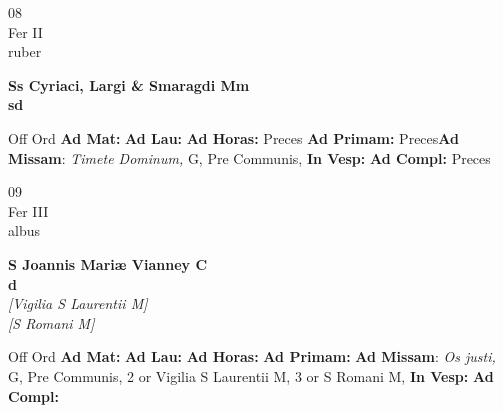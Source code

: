 \documentclass[10pt, openany]{book}
\begin{document}
    \begin{center}
        \begin{minipage}{3.5in}
            \vspace{2em}
            \begin{minipage}{0.5in}
                {\Huge 08} \\
                {\normalsize Fer II} \\
                {\normalsize ruber}
            \end{minipage}
            \begin{minipage}{3.0in}
                \textbf{ \large Ss Cyriaci, Largi \& Smaragdi Mm \\
                \textnormal{\normalsize sd}} \\ 
            \end{minipage}
            \begin{justify}Off Ord
                \textbf{Ad Mat: }
                \textbf{Ad Lau: }
                \textbf{Ad Horas: }Preces
                \textbf{Ad Primam: }Preces\textbf{Ad Missam}: \textit{Timete Dominum,} G, Pre Communis,  
                \textbf{In Vesp: }
                \textbf{Ad Compl: }Preces
            \end{justify}
        \end{minipage}
    \end{center}

    \begin{center}
        \begin{minipage}{3.5in}
            \vspace{2em}
            \begin{minipage}{0.5in}
                {\Huge 09} \\
                {\normalsize Fer III} \\
                {\normalsize albus}
            \end{minipage}
            \begin{minipage}{3.0in}
                \textbf{ \large S Joannis Mariæ Vianney C \\
                \textnormal{\normalsize d}} \\ \textit{[Vigilia S Laurentii M]} \\ \textit{[S Romani M]} \\ 
            \end{minipage}
            \begin{justify}Off Ord
                \textbf{Ad Mat: }
                \textbf{Ad Lau: }
                \textbf{Ad Horas: }
                \textbf{Ad Primam: }\textbf{Ad Missam}: \textit{Os justi,} G, Pre Communis, 2 or Vigilia S Laurentii M, 3 or S Romani M,  
                \textbf{In Vesp: }
                \textbf{Ad Compl: }
            \end{justify}
        \end{minipage}
    \end{center}
\end{document}
